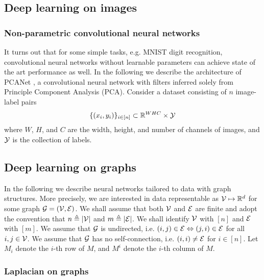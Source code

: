 \documentclass{article}
\begin{document}
\subsection{Deep learning on images}

\subsubsection{Non-parametric convolutional neural networks}

It turns out that for some simple tasks, e.g. MNIST digit recognition, convolutional neural networks without learnable parameters can achieve state of the art performance as well.
In the following we describe the architecture of PCANet \cite{chan2015pcanet}, a convolutional neural network with filters inferred solely from Principle Component Analysis (PCA).
Consider a dataset consisting of $n$ image-label pairs
\[
\{(x_i, y_i)\}_{i \in [n]} \subset {\mathbb R}^{W H C} \times {\mathcal Y}
\]
where $W$, $H$, and $C$ are the width, height, and number of channels of images, and ${\mathcal Y}$ is the collection of labels.

\subsection{Deep learning on graphs}

In the following we describe neural networks tailored to data with graph structures.
More precisely, we are interested in data representable as ${\mathcal V} \mapsto {\mathbb R}^d$ for some graph ${\mathcal G} = ({\mathcal V}, {\mathcal E})$.
We shall assume that both ${\mathcal V}$ and ${\mathcal E}$ are finite and adopt the convention that $n \triangleq |{\mathcal V}|$ and $m \triangleq |{\mathcal E}|$.
We shall identify ${\mathcal V}$ with $[n]$ and ${\mathcal E}$ with $[m]$.
We assume that ${\mathcal G}$ is undirected, i.e. $(i, j) \in {\mathcal E} \Leftrightarrow (j, i) \in {\mathcal E}$ for all $i, j \in {\mathcal V}$.
We assume that ${\mathcal G}$ has no self-connection, i.e. $(i, i) \ne {\mathcal E}$ for $i \in [n]$.
Let $M_i$ denote the $i$-th row of $M$, and $M^i$ denote the $i$-th column of $M$.

\subsubsection{Laplacian on graphs}
\end{document}
